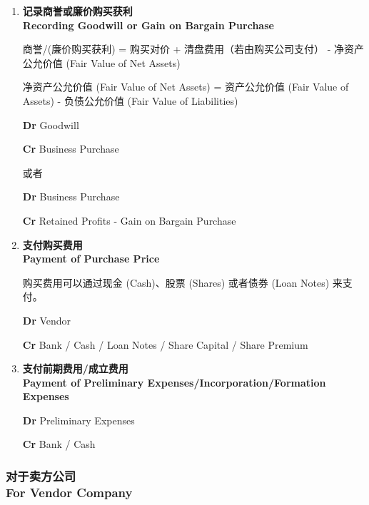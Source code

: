 \documentclass{article}
\begin{document}
\begin{enumerate}
    \item \textbf{记录商誉或廉价购买获利\\Recording Goodwill or Gain on Bargain Purchase}
    
    商誉/(廉价购买获利) = 购买对价 + 清盘费用（若由购买公司支付） - 净资产公允价值 (Fair Value of Net Assets)

    净资产公允价值 (Fair Value of Net Assets) = 资产公允价值 (Fair Value of Assets) - 负债公允价值 (Fair Value of Liabilities)

    \begin{mdframed}[backgroundcolor=gray!10]
    \textbf{Dr} Goodwill

    \hspace{1.7em}\textbf{Cr} Business Purchase
    \end{mdframed}
    或者
    \begin{mdframed}[backgroundcolor=gray!10]
    \textbf{Dr} Business Purchase

    \hspace{1.7em}\textbf{Cr} Retained Profits - Gain on Bargain Purchase
    \end{mdframed}

    \item \textbf{支付购买费用\\Payment of Purchase Price}
    
    购买费用可以通过现金 (Cash)、股票 (Shares) 或者债券 (Loan Notes) 来支付。

    \begin{mdframed}[backgroundcolor=gray!10]
    \textbf{Dr} Vendor

    \hspace{1.7em}\textbf{Cr} Bank / Cash / Loan Notes / Share Capital / Share Premium
    \end{mdframed}

    \item \textbf{支付前期费用/成立费用\\Payment of Preliminary Expenses/Incorporation/Formation Expenses}

    \begin{mdframed}[backgroundcolor=gray!10]
    \textbf{Dr} Preliminary Expenses

    \hspace{1.7em}\textbf{Cr} Bank / Cash
    \end{mdframed}
\end{enumerate}

\subsubsection{对于卖方公司\\For Vendor Company}
\end{document}
